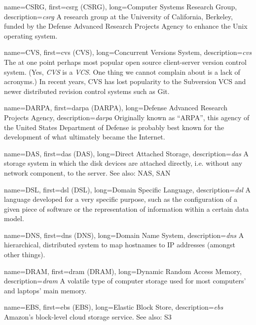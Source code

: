 {
	name={CSRG},
	first={\acrlong{csrg} (CSRG)},
	long={Computer Systems Research Group},
	description={{\em \acrlong{csrg}} A research group at the
University of California, Berkeley, funded by the Defense Advanced
Research Projects Agency to enhance the Unix operating
system.}
}

{
	name={CVS},
	first={\acrlong{cvs} (CVS)},
	long={Concurrent Versions System},
	description={{\em \acrlong{cvs}} The at one point perhaps most
popular open source client-server version control system.  (Yes, {\em CVS}
is a {\em VCS}.  One thing we cannot complain about is a lack of
acronyms.)  In recent years, CVS has lost popularity to the Subversion VCS
and newer distributed revision control systems such as
Git.}
}

{
	name={DARPA},
	first={\acrlong{darpa} (DARPA)},
	long={Defense Advanced Research Projects Agency},
	description={{\em \acrlong{darpa}} Originally
known as ``ARPA'', this agency of the United States Department of Defense
is probably best known for the development of what ultimately became the
Internet.}
}

{
	name={DAS},
	first={\acrlong{das} (DAS)},
	long={Direct Attached Storage},
	description={{\em \acrlong{das}} A storage system in which the
disk devices are attached directly, i.e. without any network component, to
the server.  See also: NAS, SAN}
}

{
	name={DSL},
	first={\acrlong{dsl} (DSL)},
	long={Domain Specific Language},
	description={{\em \acrlong{dsl}} A language developed for a very
specific purpose, such as the configuration of a given piece of software
or the representation of information within a certain
data model.}
}

{
	name={DNS},
	first={\acrlong{dns} (DNS)},
	long={Domain Name System},
	description={{\em \acrlong{dns}} A hierarchical, distributed system to
map hostnames to IP addresses (amongst other things).}
}

{
	name={DRAM},
	first={\acrlong{dram} (DRAM)},
	long={Dynamic Random Access Memory},
	description={{\em \acrlong{dram}} A volatile type of computer
storage used for most computers' and laptops' main
memory.}
}

{
	name={EBS},
	first={\acrlong{ebs} (EBS)},
	long={Elastic Block Store},
	description={{\em \acrlong{ebs}} Amazon's block-level cloud storage service.  See also: S3}
}

